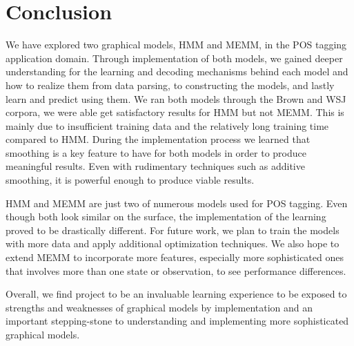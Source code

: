 \section{Conclusion}
We have explored two graphical models, HMM and MEMM, in the POS tagging application domain. Through implementation of both models, we gained deeper understanding for the learning and decoding mechanisms behind each model and how to realize them from data parsing, to constructing the models, and lastly learn and predict using them. We ran both models through the Brown and WSJ corpora, we were able get satisfactory results for HMM but not MEMM. This is mainly due to insufficient training data and the relatively long training time compared to HMM. During the implementation process we learned that smoothing is a key feature to have for both models in order to produce meaningful results. Even with rudimentary techniques such as additive smoothing, it is powerful enough to produce viable results.

HMM and MEMM are just two of numerous models used for POS tagging. Even though both look similar on the surface, the implementation of the learning proved to be drastically different. For future work, we plan to train the models with more data and apply additional optimization techniques. We also hope to extend MEMM to incorporate more features, especially more sophisticated ones that involves more than one state or observation, to see performance differences.

Overall, we find project to be an invaluable learning experience to be
exposed to strengths and weaknesses of graphical models by implementation and an important stepping-stone to understanding and implementing more sophisticated graphical models.
